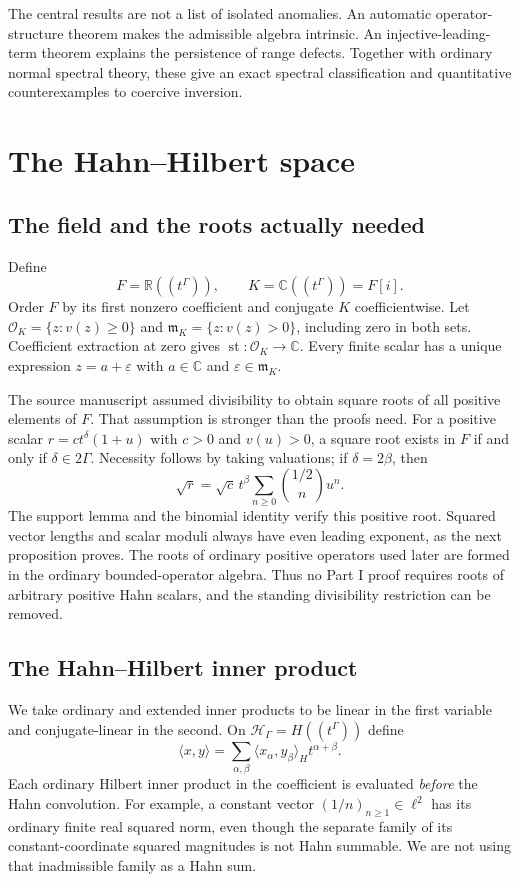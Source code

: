 \documentclass[11pt,a4paper]{article}
\numberwithin{equation}{section}
\theoremstyle{definition}
\theoremstyle{remark}
\newcommand{\C}{\mathbb C}
\newcommand{\R}{\mathbb R}
\newcommand{\K}{K}
\newcommand{\Fld}{F}
\newcommand{\mK}{\mathfrak m_K}
\newcommand{\Ocal}{\mathcal O_K}
\newcommand{\Hil}{\mathcal H_\Gamma}
\newcommand{\st}{\operatorname{st}}
\newcommand{\eps}{\varepsilon}
\newcommand{\ip}[2]{\langle#1,#2\rangle}
\begin{document}
The central results are not a list of isolated anomalies. An automatic
operator-structure theorem makes the admissible algebra intrinsic. An
injective-leading-term theorem explains the persistence of range defects.
Together with ordinary normal spectral theory, these give an exact spectral
classification and quantitative counterexamples to coercive inversion.

\section{The Hahn--Hilbert space}\label{ihs:sec:construction}

\subsection{The field and the roots actually needed}\label{ihs:hh:sec:field}
Define
\[
 \Fld=\R((t^\Gamma)),\qquad \K=\C((t^\Gamma))=\Fld[i].
\]
Order $\Fld$ by its first nonzero coefficient and conjugate $\K$
coefficientwise. Let $\Ocal=\{z:v(z)\ge0\}$ and $\mK=\{z:v(z)>0\}$,
including zero in both sets. Coefficient extraction at zero gives
$\st:\Ocal\to\C$. Every finite scalar has a unique expression
$z=a+\eps$ with $a\in\C$ and $\eps\in\mK$.

The source manuscript assumed divisibility to obtain square roots of
all positive elements of $\Fld$. That assumption is stronger than the
proofs need. For a positive scalar
$r=ct^\delta(1+u)$ with $c>0$ and $v(u)>0$, a square root exists in $\Fld$
if and only if $\delta\in2\Gamma$. Necessity follows by taking valuations;
if $\delta=2\beta$, then
\[
 \sqrt r=\sqrt c\,t^\beta\sum_{n\ge0}\binom{1/2}{n}u^n.
\]
The support lemma and the binomial identity verify this positive root.
Squared vector lengths and scalar moduli always have even leading exponent,
as the next proposition proves. The roots of ordinary positive operators
used later are formed in the ordinary bounded-operator algebra. Thus no
Part I proof requires roots of arbitrary positive Hahn scalars, and the
standing divisibility restriction can be removed.

\subsection{The Hahn--Hilbert inner product}\label{ihs:hh:sec:inner}
We take ordinary and extended inner products to be linear in the first
variable and conjugate-linear in the second. On $\Hil=H((t^\Gamma))$ define
\begin{equation}\label{ihs:hh:eq:inner}
 \ip{x}{y}=\sum_{\alpha,\beta}\ip{x_\alpha}{y_\beta}_H t^{\alpha+\beta}.
\end{equation}
Each ordinary Hilbert inner product in the coefficient is evaluated
\emph{before} the Hahn convolution. For example, a constant vector
$(1/n)_{n\ge1}\in\ell^2$ has its ordinary finite real squared norm, even
though the separate family of its constant-coordinate squared magnitudes is
not Hahn summable. We are not using that inadmissible family as a Hahn sum.
\end{document}
